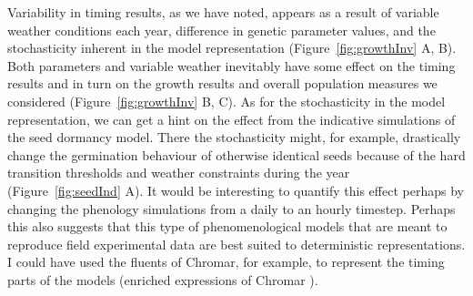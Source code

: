 Variability in timing results, as we have noted, appears as a result of variable
weather conditions each year, difference in genetic parameter values, and the
stochasticity inherent in the model representation (Figure~\ref{fig:growthInv}
A, B). Both parameters and variable weather inevitably have some effect on the
timing results and in turn on the growth results and overall population measures
we considered (Figure~\ref{fig:growthInv} B, C). As for the stochasticity in the
model representation, we can get a hint on the effect from the indicative
simulations of the seed dormancy model. There the stochasticity might, for
example, drastically change the germination behaviour of otherwise identical
seeds because of the hard transition thresholds and weather constraints during
the year (Figure~\ref{fig:seedInd} A). It would be interesting to quantify this
effect perhaps by changing the phenology simulations from a daily to an hourly
timestep. Perhaps this also suggests that this type of phenomenological models
that are meant to reproduce field experimental data are best suited to
deterministic representations. I could have used the fluents of Chromar, for
example, to represent the timing parts of the models (enriched expressions of
Chromar ).


